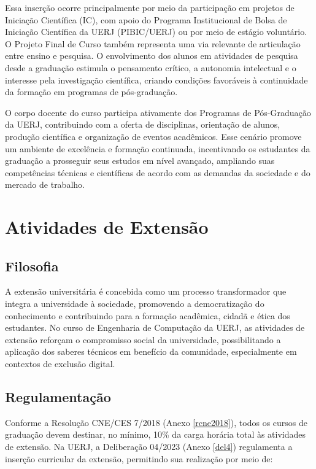 Essa inserção ocorre principalmente por meio da participação em projetos de Iniciação Científica (IC), com apoio do Programa Institucional de Bolsa de Iniciação Científica da UERJ (PIBIC/UERJ) ou por meio de estágio voluntário. O Projeto Final de Curso também representa uma via relevante de articulação entre ensino e pesquisa. O envolvimento dos alunos em atividades de pesquisa desde a graduação estimula o pensamento crítico, a autonomia intelectual e o interesse pela investigação científica, criando condições favoráveis à continuidade da formação em programas de pós-graduação.

O corpo docente do curso participa ativamente dos Programas de Pós-Graduação da UERJ, contribuindo com a oferta de disciplinas, orientação de alunos, produção científica e organização de eventos acadêmicos. Esse cenário promove um ambiente de excelência e formação continuada, incentivando os estudantes da graduação a prosseguir seus estudos em nível avançado, ampliando suas competências técnicas e científicas de acordo com as demandas da sociedade e do mercado de trabalho.

\section{Atividades de Extensão}

\subsection{Filosofia}
A extensão universitária é concebida como um processo transformador que integra a universidade à sociedade, promovendo a democratização do conhecimento e contribuindo para a formação acadêmica, cidadã e ética dos estudantes. No curso de Engenharia de Computação da UERJ, as atividades de extensão reforçam o compromisso social da universidade, possibilitando a aplicação dos saberes técnicos em benefício da comunidade, especialmente em contextos de exclusão digital.

\subsection{Regulamentação}
Conforme a Resolução CNE/CES  7/2018 (Anexo \ref{rcne2018}), todos os cursos de graduação devem destinar, no mínimo, 10\% da carga horária total às atividades de extensão. Na UERJ, a Deliberação  04/2023 (Anexo \ref{del4}) regulamenta a inserção curricular da extensão, permitindo sua realização por meio de:

